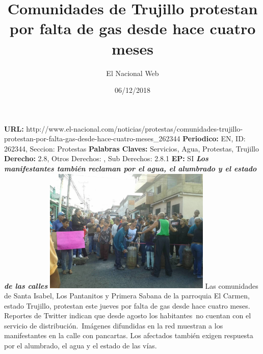\documentclass{article}%
\title{\textbf{Comunidades de Trujillo protestan por falta de gas desde hace cuatro meses}}%
\author{El Nacional Web}%
\date{06/12/2018}%
\begin{document}
%
\normalsize%
\maketitle%
\textbf{URL: }%
http://www.el{-}nacional.com/noticias/protestas/comunidades{-}trujillo{-}protestan{-}por{-}falta{-}gas{-}desde{-}hace{-}cuatro{-}meses\_262344\newline%
%
\textbf{Periodico: }%
EN, %
ID: %
262344, %
Seccion: %
Protestas\newline%
%
\textbf{Palabras Claves: }%
Servicios, Agua, Protestas, Trujillo\newline%
%
\textbf{Derecho: }%
2.8, %
Otros Derechos: %
, %
Sub Derechos: %
2.8.1\newline%
%
\textbf{EP: }%
SI\newline%
\newline%
%
\textbf{\textit{Los manifestantes también reclaman por el agua, el alumbrado y el estado de las calles}}%
\newline%
\newline%
%
\includegraphics[width=300px]{2.jpg}%
\newline%
%
Las comunidades de Santa Isabel, Los Pantanitos y Primera Sabana de la parroquia El Carmen, estado Trujillo, protestan este jueves por falta de gas desde hace cuatro meses.%
\newline%
%
Reportes de Twitter indican que desde agosto los habitantes~no cuentan con el servicio de distribución.~Imágenes difundidas en la red muestran a los manifestantes en la calle con pancartas.%
\newline%
%
Los afectados también exigen respuesta por el alumbrado, el agua y el estado de las vías.%
\newline%
%
\end{document}

